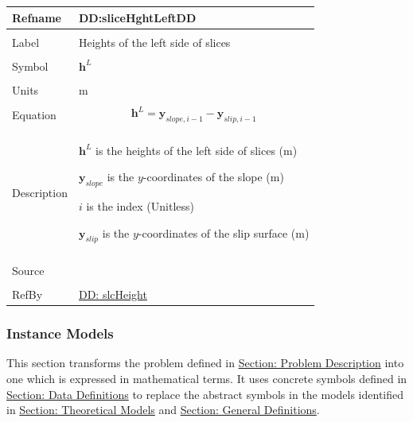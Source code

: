 \documentclass[12pt]{article}
\begin{document}
\vspace{\baselineskip}
\noindent
\begin{minipage}{\textwidth}
\begin{tabular}{>{\raggedright}p{}>{\raggedright\arraybackslash}p{}}
\toprule \textbf{Refname} & \textbf{DD:sliceHghtLeftDD}
\label{DD:sliceHghtLeftDD}
\\ \midrule \\
Label & Heights of the left side of slices
        
\\ \midrule \\
Symbol & ${\mathbf{h}^{L}}$
         
\\ \midrule \\
Units & m
        
\\ \midrule \\
Equation & \begin{displaymath}
           {\mathbf{h}^{L}}={\mathbf{y}_{slope,i-1}}-{\mathbf{y}_{slip,i-1}}
           \end{displaymath}
\\ \midrule \\
Description & \begin{symbDescription}
              \item{${\mathbf{h}^{L}}$ is the heights of the left side of slices (m)}
              \item{${\mathbf{y}_{slope}}$ is the $y$-coordinates of the slope (m)}
              \item{$i$ is the index (Unitless)}
              \item{${\mathbf{y}_{slip}}$ is the $y$-coordinates of the slip surface (m)}
              \end{symbDescription}
\\ \midrule \\
Source & \cite{fredlund1977}
         
\\ \midrule \\
RefBy & \hyperref[DD:slcHeight]{DD: slcHeight}
        
\\ \bottomrule
\end{tabular}
\end{minipage}

\subsubsection{Instance Models}
\label{Sec:IMs}
This section transforms the problem defined in \hyperref[Sec:ProbDesc]{Section: Problem Description} into one which is expressed in mathematical terms. It uses concrete symbols defined in \hyperref[Sec:DDs]{Section: Data Definitions} to replace the abstract symbols in the models identified in \hyperref[Sec:TMs]{Section: Theoretical Models} and \hyperref[Sec:GDs]{Section: General Definitions}.
\end{document}
